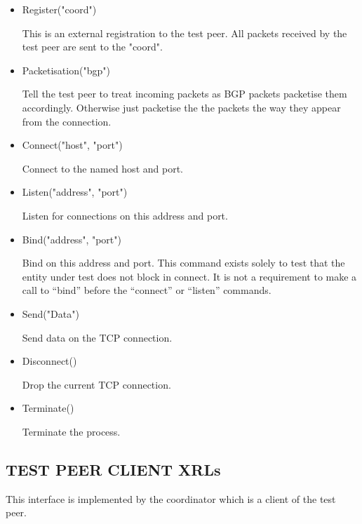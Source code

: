 \documentclass[11pt]{article}
\begin{document}
\begin{itemize}
  \item Register("coord")
  
  This is an external registration to the test peer. All packets
  received by the test peer are sent to the "coord".

  \item Packetisation("bgp")
  
  Tell the test peer to treat incoming packets as BGP packets
  packetise them accordingly. Otherwise just packetise the the packets
  the way they appear from the connection.
        
  \item Connect("host", "port")

  Connect to the named host and port.

  \item Listen("address", "port")

  Listen for connections on this address and port.

  \item Bind("address", "port")

  Bind on this address and port. This command exists solely to test
  that the entity under test does not block in connect. It is not a
  requirement to make a call to ``bind'' before the ``connect'' or
  ``listen'' commands. 

  \item Send("Data")
  
  Send data on the TCP connection.        

  \item Disconnect()

  Drop the current TCP connection.

  \item Terminate()

  Terminate the process.

\end{itemize}

\subsection{TEST PEER CLIENT XRLs}

This interface is implemented by the coordinator which is a client of
the test peer.
\end{document}
